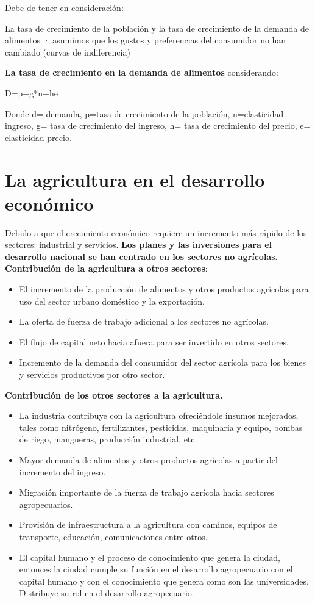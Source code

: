 \documentclass[
  a4paper,
]{article}
\begin{document}
Debe de tener en consideración:

La tasa de crecimiento de la población y la tasa de crecimiento de la
demanda de alimentos · asumimos que los gustos y preferencias del
consumidor no han cambiado (curvas de indiferencia)

\textbf{La tasa de crecimiento en la demanda de alimentos} considerando:

D=p+g*n+he

Donde d= demanda, p=tasa de crecimiento de la población, n=elasticidad
ingreso, g= tasa de crecimiento del ingreso, h= tasa de crecimiento del
precio, e= elasticidad precio.

\hypertarget{la-agricultura-en-el-desarrollo-econuxf3mico}{%
\section{La agricultura en el desarrollo
económico}\label{la-agricultura-en-el-desarrollo-econuxf3mico}}

Debido a que el crecimiento económico requiere un incremento más rápido
de los sectores: industrial y servicios. \textbf{Los planes y las
inversiones para el desarrollo nacional se han centrado en los sectores
no agrícolas}. \textbf{Contribución de la agricultura a otros sectores}:

\begin{itemize}
\item
  El incremento de la producción de alimentos y otros productos
  agrícolas para uso del sector urbano doméstico y la exportación.
\item
  La oferta de fuerza de trabajo adicional a los sectores no agrícolas.
\item
  El flujo de capital neto hacia afuera para ser invertido en otros
  sectores.
\item
  Incremento de la demanda del consumidor del sector agrícola para los
  bienes y servicios productivos por otro sector.
\end{itemize}

\textbf{Contribución de los otros sectores a la agricultura.}

\begin{itemize}
\item
  La industria contribuye con la agricultura ofreciéndole insumos
  mejorados, tales como nitrógeno, fertilizantes, pesticidas, maquinaria
  y equipo, bombas de riego, mangueras, producción industrial, etc.
\item
  Mayor demanda de alimentos y otros productos agrícolas a partir del
  incremento del ingreso.
\item
  Migración importante de la fuerza de trabajo agrícola hacia sectores
  agropecuarios.
\item
  Provisión de infraestructura a la agricultura con caminos, equipos de
  transporte, educación, comunicaciones entre otros.
\item
  El capital humano y el proceso de conocimiento que genera la ciudad,
  entonces la ciudad cumple su función en el desarrollo agropecuario con
  el capital humano y con el conocimiento que genera como son las
  universidades. Distribuye su rol en el desarrollo agropecuario.
\end{itemize}
\end{document}
